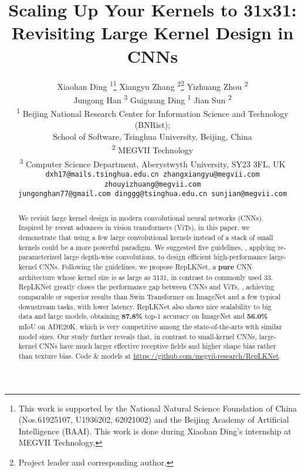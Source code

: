 \documentclass[10pt,twocolumn,letterpaper]{article}
\begin{document}
	


	\title{Scaling Up Your Kernels to 31x31: Revisiting Large Kernel Design in CNNs}
	
	\author{Xiaohan Ding \textsuperscript{1}\thanks{This work is supported by the National Natural Science
			Foundation of China (Nos.61925107, U1936202, 62021002) and the Beijing Academy of Artificial Intelligence (BAAI). This work is done during Xiaohan Ding's internship at MEGVII Technology.} 
		\quad Xiangyu Zhang \textsuperscript{2}\thanks{Project leader and corresponding author.}  
		\quad Yizhuang Zhou \textsuperscript{2} \\
		Jungong Han \textsuperscript{3} 
		\quad Guiguang Ding \textsuperscript{1}
		\quad Jian Sun \textsuperscript{2} \\
		\textsuperscript{1} Beijing National Research Center for Information Science and Technology (BNRist); \\School of Software, Tsinghua University, Beijing, China \\
		\textsuperscript{2} MEGVII Technology \\
		\textsuperscript{3} Computer Science Department, Aberystwyth University, SY23 3FL, UK \\
		\tt\small dxh17@mails.tsinghua.edu.cn \quad zhangxiangyu@megvii.com \quad zhouyizhuang@megvii.com\\
		\tt\small jungonghan77@gmail.com \quad dinggg@tsinghua.edu.cn \quad sunjian@megvii.com \\
	}
	
	\maketitle
	
	
	
\begin{abstract}
	    We revisit large kernel design in modern convolutional neural networks (CNNs). Inspired by recent advances in vision transformers (ViTs), in this paper, we demonstrate that using a few large convolutional kernels instead of a stack of small kernels could be a more powerful paradigm. We suggested five guidelines, \eg, applying re-parameterized large depth-wise convolutions, to design efficient high-performance large-kernel CNNs. Following the guidelines, we propose RepLKNet, a \textbf{pure} CNN architecture whose kernel size is as large as 3131, in contrast to commonly used 33. RepLKNet greatly closes the performance gap between CNNs and ViTs, \eg, achieving comparable or superior results than Swin Transformer on ImageNet and a few typical downstream tasks, with lower latency. RepLKNet also shows nice scalability to big data and large models, obtaining \textbf{87.8\%} top-1 accuracy on ImageNet and \textbf{56.0\%} mIoU on ADE20K, which is very competitive among the state-of-the-arts with similar model sizes. Our study further reveals that, in contrast to small-kernel CNNs, large-kernel CNNs have much larger effective receptive fields and higher shape bias rather than texture bias. Code \& models at \url{https://github.com/megvii-research/RepLKNet}.
	\end{abstract}
	
\end{document}
